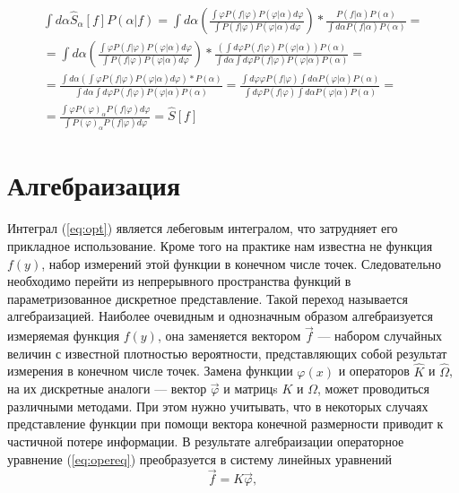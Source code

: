 \begin{equation}
\begin{split}
\int d\alpha \hat{S}_{\alpha}[f] P(\alpha|f) = \int d\alpha \left(\frac{\int \varphi P(f|\varphi) P(\varphi|\alpha)d\varphi}{\int P(f|\varphi) P(\varphi|\alpha)d\varphi} \right) * \frac{P(f|\alpha)P(\alpha)}{\int d\alpha P(f|\alpha)P(\alpha)} = \\
= \int d\alpha\left(\frac{\int \varphi P(f|\varphi) P(\varphi|\alpha)d\varphi}{\int P(f|\varphi) P(\varphi|\alpha)d\varphi} \right) * \frac{\left(\int d\varphi P(f|\varphi)P(\varphi|\alpha)\right)P(\alpha)}{\int d\alpha\int d\varphi P(f|\varphi)P(\varphi|\alpha)P(\alpha)} = \\ =
\frac{\int d\alpha \left( \int \varphi P(f|\varphi) P(\varphi|\alpha)d\varphi \right)*P(\alpha)}{\int d\alpha\int d\varphi P(f|\varphi)P(\varphi|\alpha)P(\alpha)} =  \frac{\int d\varphi \varphi P(f|\varphi) \int d\alpha P(\varphi|\alpha)P(\alpha)}{\int d\varphi P(f|\varphi) \int d\alpha P(\varphi|\alpha)P(\alpha)} = \\=
\frac{\int \varphi P(\varphi)_{\alpha}P(f|\varphi) d\varphi }{\int P(\varphi)_{\alpha}P(f|\varphi)d\varphi} = \hat{S}[f]
\end{split} 
\end{equation}

\section{Алгебраизация}
Интеграл (\ref{eq:opt}) является лебеговым интегралом, что затрудняет его прикладное использование. Кроме того на практике нам известна не функция $f(y)$, набор измерений этой функции в конечном числе точек. Следовательно необходимо перейти из непрерывного пространства функций в параметризованное дискретное представление. Такой переход называется алгебраизацией. Наиболее очевидным и однозначным образом алгебраизуется измеряемая функция $f(y)$, она заменяется вектором $\vec{f}$ --- набором случайных величин с известной плотностью вероятности, представляющих собой результат измерения в конечном числе точек. Замена функции $\varphi(x)$ и операторов $\hat{K}$ и $\hat{\Omega}$, на их дискретные аналоги --- вектор $\vec{\varphi}$ и матрицs $K$ и $\Omega$, может проводиться различными методами. 
При этом нужно учитывать, что в некоторых случаях представление функции при помощи вектора конечной размерности приводит к частичной потере информации.
В результате алгебраизации операторное уравнение (\ref{eq:opereq}) преобразуется в систему линейных уравнений
\begin{equation}
\vec{f} = K\vec{\varphi},
\label{eq:algebr}
\end{equation}

